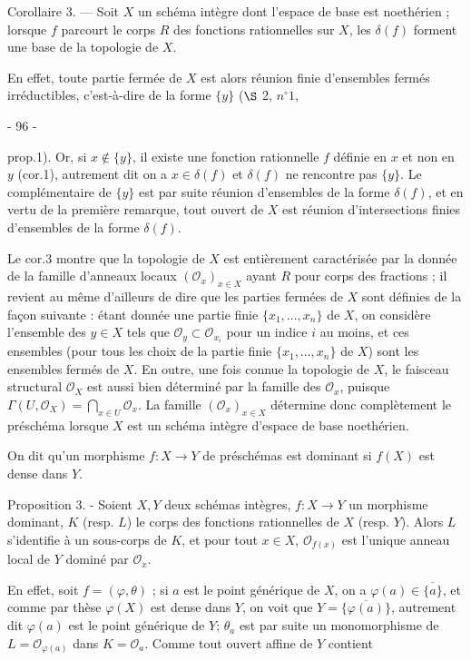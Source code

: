 Corollaire 3. — Soit $X$ un schéma intègre dont l'espace de base est noethérien ; lorsque $f$ parcourt le corps $R$ des fonctions rationnelles sur $X$, les $\delta(f)$ forment une base de la topologie de $X$.

En effet, toute partie fermée de $X$ est alors réunion finie d'ensembles fermés irréductibles, c'est-à-dire de la forme $\{y\}$ ($\S$ 2, $n^{\circ}1$,

\newpage


- 96 -

prop.1). Or, si $x \notin \{y\}$, il existe une fonction rationnelle $f$ définie en $x$ et non en $y$ (cor.1), autrement dit on a $x \in \delta(f)$ et $\delta(f)$ ne rencontre pas $\{y\}$. Le complémentaire de $\{y\}$ est par suite réunion d'ensembles de la forme $\delta(f)$, et en vertu de la première remarque, tout ouvert de $X$ est réunion d'intersections finies d'ensembles de la forme $\delta(f)$.

Le cor.3 montre que la topologie de $X$ est entièrement caractérisée par la donnée de la famille d'anneaux locaux $(\mathcal{O}_x)_{x \in X}$ ayant $R$ pour corps des fractions ; il revient au même d'ailleurs de dire que les parties fermées de $X$ sont définies de la façon suivante : étant donnée une partie finie $\{x_1, \dots, x_n\}$ de $X$, on considère l'ensemble des $y \in X$ tels que $\mathcal{O}_y \subset \mathcal{O}_{x_i}$ pour un indice $i$ au moins, et ces ensembles (pour tous les choix de la partie finie $\{x_1, \dots, x_n\}$ de $X$) sont les ensembles fermés de $X$. En outre, une fois connue la topologie de $X$, le faisceau structural $\mathcal{O}_X$ est aussi bien déterminé par la famille des $\mathcal{O}_x$, puisque $\Gamma(U, \mathcal{O}_X) = \bigcap_{x \in U} \mathcal{O}_x$. La famille $(\mathcal{O}_x)_{x \in X}$ détermine donc complètement le préschéma lorsque $X$ est un schéma intègre d'espace de base noethérien.

On dit qu'un morphisme $f : X \to Y$ de préschémas est dominant si $f(X)$ est dense dans $Y$.

Proposition 3. - Soient $X, Y$ deux schémas intègres, $f : X \to Y$ un morphisme dominant, $K$ (resp. $L$) le corps des fonctions rationnelles de $X$ (resp. $Y$). Alors $L$ s'identifie à un sous-corps de $K$, et pour tout $x \in X$, $\mathcal{O}_{f(x)}$ est l'unique anneau local de $Y$ dominé par $\mathcal{O}_x$.

En effet, soit $f = (\varphi, \theta)$ ; si $a$ est le point générique de $X$, on a $\varphi(a) \in \overline{\{a\}}$, et comme par thèse $\varphi(X)$ est dense dans $Y$, on voit que $Y = \overline{\{\varphi(a)\}}$, autrement dit $\varphi(a)$ est le point générique de $Y$; $\theta_a$ est par suite un monomorphisme de $L = \mathcal{O}_{\varphi(a)}$ dans $K = \mathcal{O}_a$. Comme tout ouvert affine de $Y$ contient

